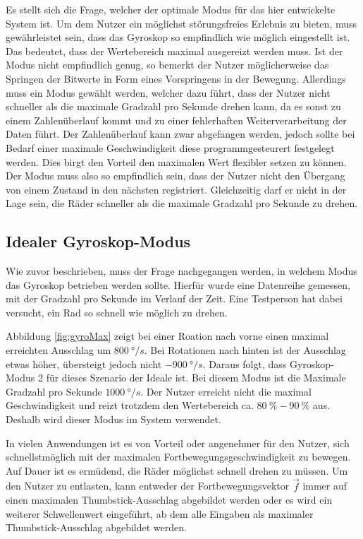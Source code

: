 Es stellt sich die Frage, welcher der optimale Modus für das hier entwickelte System ist.
Um dem Nutzer ein möglichst störungsfreies Erlebnis zu bieten, muss gewährleistet sein, dass das Gyroskop so empfindlich wie möglich eingestellt ist.
Das bedeutet, dass der Wertebereich maximal ausgereizt werden muss.
Ist der Modus nicht empfindlich genug, so bemerkt der Nutzer möglicherweise das Springen der Bitwerte in Form eines Vorspringens in der Bewegung.
Allerdings muss ein Modus gewählt werden, welcher dazu führt, dass der Nutzer nicht schneller als die maximale Gradzahl pro Sekunde drehen kann, da es sonst zu einem Zahlenüberlauf kommt und zu einer fehlerhaften Weiterverarbeitung der Daten führt.
Der Zahlenüberlauf kann zwar abgefangen werden, jedoch sollte bei Bedarf einer maximale Geschwindigkeit diese programmgesteurert festgelegt werden.
Dies birgt den Vorteil den maximalen Wert flexibler setzen zu können.
Der Modus muss also so empfindlich sein, dass der Nutzer nicht den Übergang von einem Zustand in den nächsten registriert.
Gleichzeitig darf er nicht in der Lage sein, die Räder schneller als die maximale Gradzahl pro Sekunde zu drehen.

\subsection{Idealer Gyroskop-Modus}
Wie zuvor beschrieben, muss der Frage nachgegangen werden, in welchem Modus das Gyroskop betrieben werden sollte.
Hierfür wurde eine Datenreihe gemessen, mit der Gradzahl pro Sekunde im Verlauf der Zeit.
Eine Testperson hat dabei versucht, ein Rad so schnell wie möglich zu drehen.



Abbildung \ref{fig:gyroMax} zeigt bei einer Roation nach vorne einen maximal erreichten Ausschlag um $800\ \si{\degree}/s$.
Bei Rotationen nach hinten ist der Ausschlag etwas höher, übersteigt jedoch nicht $-900\ \si{\degree}/s$.
Daraus folgt, dass Gyroskop-Modus 2 für dieses Szenario der Ideale ist.
Bei diesem Modus ist die Maximale Gradzahl pro Sekunde $1000\ \si{\degree}/s$.
Der Nutzer erreicht nicht die maximal Geschwindigkeit und reizt trotzdem den Wertebereich ca. $80\ \%-90\ \%$ aus. Deshalb wird dieser Modus im System verwendet.

In vielen Anwendungen ist es von Vorteil oder angenehmer für den Nutzer, sich schnellstmöglich mit der maximalen Fortbewegungsgeschwindigkeit zu bewegen.
Auf Dauer ist es ermüdend, die Räder möglichst schnell drehen zu müssen.
Um den Nutzer zu entlasten, kann entweder der Fortbewegungsvektor $\vec{f}$ immer auf einen maximalen Thumbstick-Ausschlag abgebildet werden oder es wird ein weiterer Schwellenwert eingeführt, ab dem alle Eingaben als maximaler Thumbstick-Ausschlag abgebildet werden.

